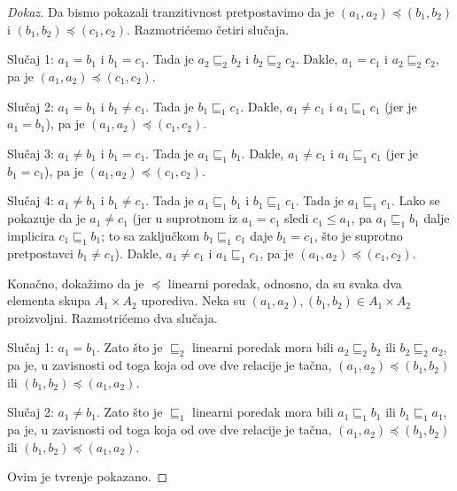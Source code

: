 \begin{proof}[Dokaz]
  \medskip
  
  Da bismo pokazali tranzitivnost pretpostavimo da je $(a_1, a_2) \preccurlyeq (b_1, b_2)$ i $(b_1, b_2) \preccurlyeq (c_1, c_2)$.
  Razmotri\'cemo \v cetiri slu\v caja.
  
  \medskip
  
  Slu\v caj 1: $a_1 = b_1$ i $b_1 = c_1$. Tada je $a_2 \mathrel{\sqsubseteq_2} b_2$ i $b_2 \mathrel{\sqsubseteq_2} c_2$.
  Dakle, $a_1 = c_1$ i $a_2 \mathrel{\sqsubseteq_2} c_2$, pa je $(a_1, a_2) \preccurlyeq (c_1, c_2)$.
  
  \medskip

  Slu\v caj 2: $a_1 = b_1$ i $b_1 \ne c_1$. Tada je $b_1 \mathrel{\sqsubseteq_1} c_1$.
  Dakle, $a_1 \ne c_1$ i $a_1 \mathrel{\sqsubseteq_1} c_1$ (jer je $a_1 = b_1$), pa je $(a_1, a_2) \preccurlyeq (c_1, c_2)$.

  \medskip

  Slu\v caj 3: $a_1 \ne b_1$ i $b_1 = c_1$. Tada je $a_1 \mathrel{\sqsubseteq_1} b_1$.
  Dakle, $a_1 \ne c_1$ i $a_1 \mathrel{\sqsubseteq_1} c_1$ (jer je $b_1 = c_1$), pa je $(a_1, a_2) \preccurlyeq (c_1, c_2)$.

  \medskip

  Slu\v caj 4: $a_1 \ne b_1$ i $b_1 \ne c_1$. Tada je $a_1 \mathrel{\sqsubseteq_1} b_1$ i $b_1 \mathrel{\sqsubseteq_1} c_1$.
  Tada je $a_1 \mathrel{\sqsubseteq_1} c_1$. Lako se pokazuje da je $a_1 \ne c_1$
  (jer u suprotnom iz $a_1 = c_1$ sledi $c_1 \le a_1$, pa $a_1 \mathrel{\sqsubseteq_1} b_1$ dalje implicira $c_1 \mathrel{\sqsubseteq_1} b_1$;
  to sa zaklju\v ckom $b_1 \mathrel{\sqsubseteq_1} c_1$ daje $b_1 = c_1$, \v sto je suprotno pretpostavci $b_1 \ne c_1$).
  Dakle, $a_1 \ne c_1$ i $a_1 \mathrel{\sqsubseteq_1} c_1$, pa je $(a_1, a_2) \preccurlyeq (c_1, c_2)$.
  
  \medskip
  
  Kona\v cno, doka\v zimo da je $\preccurlyeq$ linearni poredak, odnosno, da su svaka dva elementa skupa $A_1 \times A_2$
  uporediva. Neka su $(a_1, a_2), (b_1, b_2) \in A_1 \times A_2$ proizvoljni. Razmotri\'cemo dva slu\v caja.
  
  \medskip
  
  Slu\v caj 1: $a_1 = b_1$. Zato \v sto je $\sqsubseteq_2$ linearni poredak mora bili $a_2 \mathrel{\sqsubseteq_2} b_2$
  ili $b_2 \mathrel{\sqsubseteq_2} a_2$, pa je, u zavisnosti od toga koja od ove dve relacije je ta\v cna,
  $(a_1, a_2) \preccurlyeq (b_1, b_2)$ ili $(b_1, b_2) \preccurlyeq (a_1, a_2)$.
  
  \medskip
  
  Slu\v caj 2: $a_1 \ne b_1$. Zato \v sto je $\sqsubseteq_1$ linearni poredak mora bili $a_1 \mathrel{\sqsubseteq_1} b_1$
  ili $b_1 \mathrel{\sqsubseteq_1} a_1$, pa je, u zavisnosti od toga koja od ove dve relacije je ta\v cna,
  $(a_1, a_2) \preccurlyeq (b_1, b_2)$ ili $(b_1, b_2) \preccurlyeq (a_1, a_2)$.
  
  \medskip
  
  Ovim je tvr\dj enje pokazano.
\end{proof}



